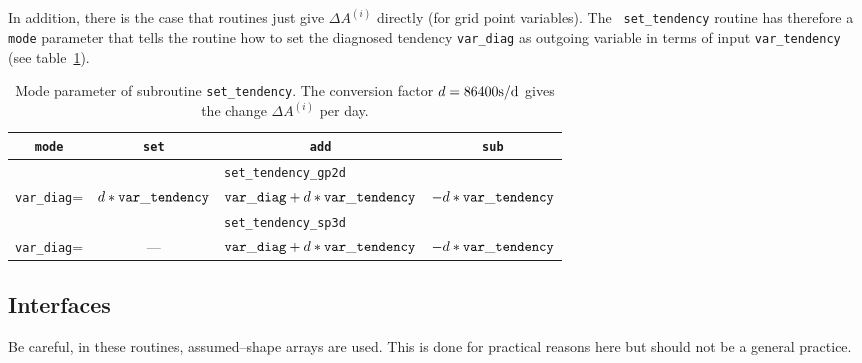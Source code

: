 \begin{appendix}
\begin{description}
  In addition, there is the case that routines just give
  $\Delta A^{(i)}$ directly (for grid point variables). The {\tt
    set\_tendency} routine has 
  therefore a {\tt mode} parameter that tells the routine how to set
  the diagnosed tendency {\tt var\_diag} as outgoing variable in terms
  of input {\tt var\_tendency} (see table~\ref{tab_mod}). \newline
\end{description}

\begin{table}[ht]
\caption{Mode parameter of subroutine {\tt set\_tendency}. The
  conversion factor $d=86400{\rm
    s/d}$ gives the
  change $\Delta A^{(i)}$ per day.}\label{tab_mod} 
  \begin{tabular*}{\textwidth}{c@{\extracolsep\fill}ccc}\hline
  {\tt mode} & {\tt set} & {\tt add} & {\tt sub} \\\hline
  \multicolumn{4}{c}{{\tt set\_tendency\_gp2d}}\\\hline
  {\tt var\_diag}= & $d*{\tt var\_tendency}$ & ${\tt
    var\_diag}+d*{\tt var\_tendency}$ & $-d*{\tt
    var\_tendency}$\\\hline 
  \multicolumn{4}{c}{{\tt set\_tendency\_sp3d}}\\\hline
  {\tt var\_diag}= & --- & ${\tt var\_diag}+ d* {\tt var\_tendency}$ &
  $- d * {\tt var\_tendency}$ \\\hline
  \end{tabular*}
\end{table}

\subsection{Interfaces}

Be careful, in these routines, assumed--shape arrays are used. This is
done for practical reasons here but should not be a general practice. 


\end{appendix}
